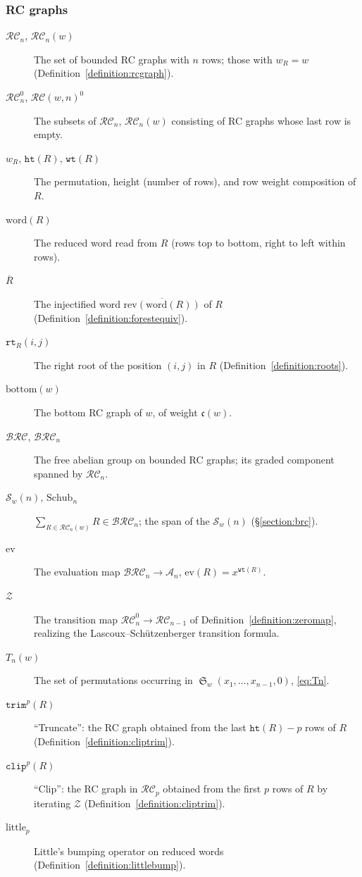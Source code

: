 \documentclass{amsart}
\theoremstyle{definition}
\theoremstyle{remark}
\numberwithin{equation}{subsection}
\DeclareMathOperator{\sch}{\mathfrak{S}}
\newcommand{\wof}[1]{w_{#1}}
\newcommand{\wtt}{\mathtt{wt}}
\newcommand{\rtt}{\mathtt{rt}}
\newcommand{\trm}{\mathtt{trim}}
\newcommand{\zeromap}{\mathcal{Z}}
\newcommand{\hr}{\mathtt{ht}}
\newcommand{\clp}{\mathtt{clip}}
\newcommand{\BRC}{\mathcal{BRC}}
\newcommand{\RC}{\mathcal{RC}}
\newcommand{\ltb}{\mathrm{little}}
\newcommand{\coma}{\mathcal{A}}
\newcommand{\code}{\mathfrak{c}}
\begin{document}
\subsubsection*{RC graphs}
\begin{description}
\item[$\RC_n$, $\RC_n(w)$] The set of bounded RC graphs with $n$ rows; those with $\wof{R}=w$ (Definition~\ref{definition:rcgraph}).
\item[$\RC_n^0$, $\RC(w,n)^0$] The subsets of $\RC_n$, $\RC_n(w)$ consisting of RC graphs whose last row is empty.
\item[$\wof{R}$, $\hr(R)$, $\wtt(R)$] The permutation, height (number of rows), and row weight composition of $R$.
\item[$\mathrm{word}(R)$] The reduced word read from $R$ (rows top to bottom, right to left within rows).
\item[$\overline{R}$] The injectified word $\overline{\mathrm{rev}(\mathrm{word}(R))}$ of $R$ (Definition~\ref{definition:forestequiv}).
\item[$\rtt_R(i,j)$] The right root of the position $(i,j)$ in $R$ (Definition~\ref{definition:roots}).
\item[$\mathrm{bottom}(w)$] The bottom RC graph of $w$, of weight $\code(w)$.
\item[$\BRC$, $\BRC_n$] The free abelian group on bounded RC graphs; its graded component spanned by $\RC_n$.
\item[$\mathcal{S}_w(n)$, $\mathrm{Schub}_n$] $\sum_{R\in\RC_n(w)}R\in\BRC_n$; the span of the $\mathcal{S}_w(n)$ (\S\ref{section:brc}).
\item[$\mathrm{ev}$] The evaluation map $\BRC_n\to\coma_n$, $\mathrm{ev}(R)=x^{\wtt(R)}$.
\item[$\zeromap$] The transition map $\RC_n^0\to\RC_{n-1}$ of Definition~\ref{definition:zeromap}, realizing the Lascoux--Sch\"utzenberger transition formula.
\item[$T_n(w)$] The set of permutations occurring in $\sch_w(x_1,\ldots,x_{n-1},0)$, \eqref{eq:Tn}.
\item[$\trm^p(R)$] ``Truncate'': the RC graph obtained from the last $\hr(R)-p$ rows of $R$ (Definition~\ref{definition:cliptrim}).
\item[$\clp^p(R)$] ``Clip'': the RC graph in $\RC_p$ obtained from the first $p$ rows of $R$ by iterating $\zeromap$ (Definition~\ref{definition:cliptrim}).
\item[$\ltb_p$] Little's bumping operator on reduced words (Definition~\ref{definition:littlebump}).
\end{description}
\end{document}
